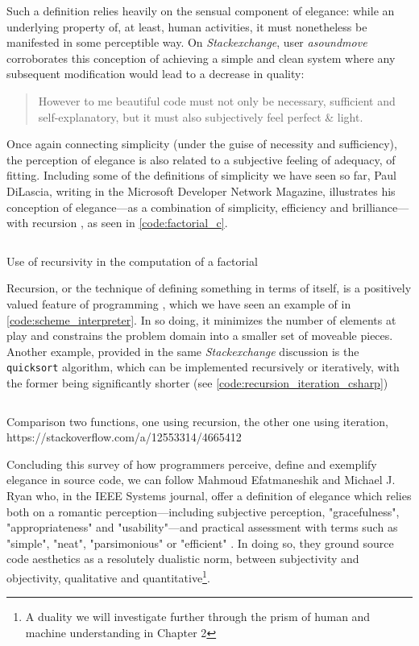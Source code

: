Such a definition relies heavily on the sensual component of elegance: while an underlying property of, at least, human activities, it must nonetheless be manifested in some perceptible way. On \emph{Stackexchange}, user \emph{asoundmove} corroborates this conception of achieving a simple and clean system where any subsequent modification would lead to a decrease in quality:

\begin{quote}
  However to me beautiful code must not only be necessary, sufficient and self-explanatory, but it must also subjectively feel perfect \& light. \citep{stackoverflow_how_2013}
\end{quote}

Once again connecting simplicity (under the guise of necessity and sufficiency), the perception of elegance is also related to a subjective feeling of adequacy, of fitting. Including some of the definitions of simplicity we have seen so far, Paul DiLascia, writing in the Microsoft Developer Network Magazine, illustrates his conception of elegance—as a combination of simplicity, efficiency and brilliance—with recursion \citep{dilascia_end_2019}, as seen in \ref{code:factorial_c}.

\begin{listing}
  \inputminted{c}{./corpus/factorial.c}
  \caption{Use of recursivity in the computation of a factorial}
  \label{code:factorial_c}
\end{listing}

Recursion, or the technique of defining something in terms of itself, is a positively valued feature of programming \citep{abelson_structure_1979}, which we have seen an example of in \ref{code:scheme_interpreter}. In so doing, it minimizes the number of elements at play and constrains the problem domain into a smaller set of moveable pieces. Another example, provided in the same \emph{Stackexchange} discussion is the \lstinline{quicksort} algorithm, which can be implemented recursively or iteratively, with the former being significantly shorter (see \ref{code:recursion_iteration_csharp})

\begin{listing}
  \inputminted{csharp}{./corpus/recursive_iteration.cs}
  \caption{Comparison two functions, one using recursion, the other one using iteration, https://stackoverflow.com/a/12553314/4665412}
  \label{code:recursion_iteration_csharp}
\end{listing}

Concluding this survey of how programmers perceive, define and exemplify elegance in source code, we can follow Mahmoud Efatmaneshik and Michael J. Ryan who, in the IEEE Systems journal, offer a definition of elegance which relies both on a romantic perception—including subjective perception, "gracefulness", "appropriateness" and "usability"—and practical assessment with terms such as "simple", "neat", "parsimonious" or "efficient" \citep{efatmaneshnik_definitions_2019}. In doing so, they ground source code aesthetics as a resolutely dualistic norm, between subjectivity and objectivity, qualitative and quantitative\footnote{A duality we will investigate further through the prism of human and machine understanding in Chapter 2}.

